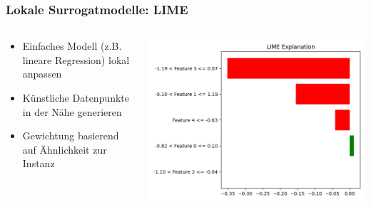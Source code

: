 \documentclass[aspectratio=1610, xcolor=dvipsnames, 9pt]{beamer}
\begin{document}
\begin{frame}
  \frametitle{Lokale Surrogatmodelle: LIME}
  \begin{columns}
    \begin{column}{0.6\textwidth}
      \begin{itemize}
        \item Einfaches Modell (z.B. lineare Regression) lokal anpassen
        \item Künstliche Datenpunkte in der Nähe generieren
        \item Gewichtung basierend auf Ähnlichkeit zur Instanz
      \end{itemize}
    \end{column}
    \begin{column}{0.4\textwidth}
      \includegraphics[width=\textwidth]{images/lime.png}
    \end{column}
  \end{columns}
\end{frame}
\end{document}
